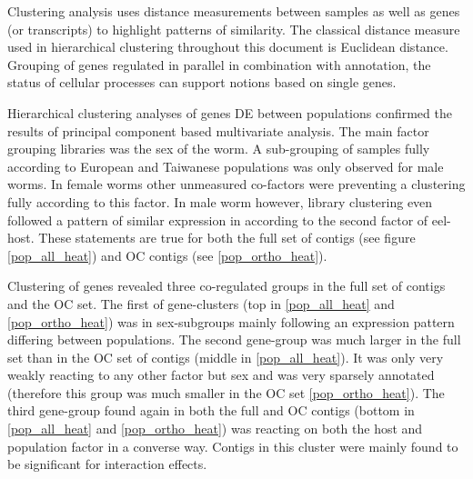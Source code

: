 Clustering analysis uses distance measurements between samples as well
as genes (or transcripts) to highlight patterns of similarity. The
classical distance measure used in hierarchical clustering throughout
this document is Euclidean distance. Grouping of genes regulated in
parallel in combination with annotation, the status of cellular
processes can support notions based on single genes.

Hierarchical clustering analyses of genes DE between populations
confirmed the results of principal component based multivariate
analysis. The main factor grouping libraries was the sex of the
worm. A sub-grouping of samples fully according to European and
Taiwanese populations was only observed for male worms. In female
worms other unmeasured co-factors were preventing a clustering fully
according to this factor. In male worm however, library clustering
even followed a pattern of similar expression in according to the
second factor of eel-host. These statements are true for both the full
set of contigs (see figure \ref{pop_all_heat}) and OC contigs (see
\ref{pop_ortho_heat}).

Clustering of genes revealed three co-regulated groups in the full set
of contigs and the OC set. The first of gene-clusters (top in
\ref{pop_all_heat} and \ref{pop_ortho_heat}) was in sex-subgroups
mainly following an expression pattern differing between
populations. The second gene-group was much larger in the full set
than in the OC set of contigs (middle in \ref{pop_all_heat}). It was
only very weakly reacting to any other factor but sex and was very
sparsely annotated (therefore this group was much smaller in the OC
set \ref{pop_ortho_heat}). The third gene-group found again in both
the full and OC contigs (bottom in \ref{pop_all_heat} and
\ref{pop_ortho_heat}) was reacting on both the host and population
factor in a converse way. Contigs in this cluster were mainly found to
be significant for interaction effects.


